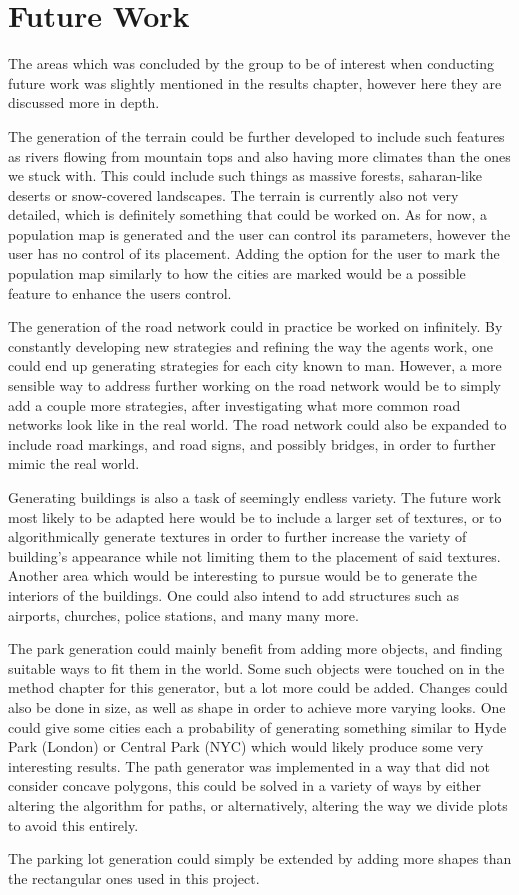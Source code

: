 \section{Future Work}
The areas which was concluded by the group to be of interest when conducting future work was slightly mentioned in the results chapter, however here they are discussed more in depth.

The generation of the terrain could be further developed to include such features as rivers flowing from mountain tops and also having more climates than the ones we stuck with.
This could include such things as massive forests, saharan-like deserts or snow-covered landscapes.
The terrain is currently also not very detailed, which is definitely something that could be worked on. 
As for now, a population map is generated and the user can control its parameters, however the user has no control of its placement. 
Adding the option for the user to mark the population map similarly to how the cities are marked would be a possible feature to enhance the users control. 

The generation of the road network could in practice be worked on infinitely.
By constantly developing new strategies and refining the way the agents work, one could end up generating strategies for each city known to man.
However, a more sensible way to address further working on the road network would be to simply add a couple more strategies, after investigating what more common road networks look like in the real world.
The road network could also be expanded to include road markings, and road signs, and possibly bridges, in order to further mimic the real world.  

Generating buildings is also a task of seemingly endless variety. 
The future work most likely to be adapted here would be to include a larger set of textures, or to algorithmically generate textures in order to further increase the variety of building's appearance while not limiting them to the placement of said textures.
Another area which would be interesting to pursue would be to generate the interiors of the buildings. 
One could also intend to add structures such as airports, churches, police stations, and many many more. 

The park generation could mainly benefit from adding more objects, and finding suitable ways to fit them in the world.
Some such objects were touched on in the method chapter for this generator, but a lot more could be added.
Changes could also be done in size, as well as shape in order to achieve more varying looks. 
One could give some cities each a probability of generating something similar to Hyde Park (London) or Central Park (NYC) which would likely produce some very interesting results.
The path generator was implemented in a way that did not consider concave polygons, this could be solved in a variety of ways by either altering the algorithm for paths, or alternatively, altering the way we divide plots to avoid this entirely. 

The parking lot generation could simply be extended by adding more shapes than the rectangular ones used in this project.



